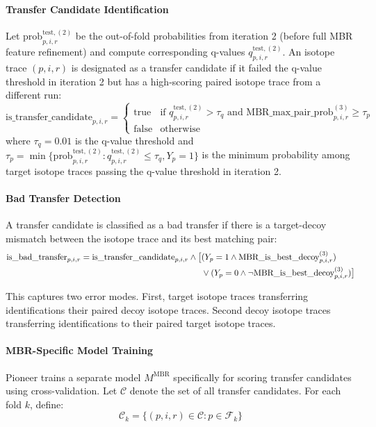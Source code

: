 \documentclass[pdflatex,sn-nature]{sn-jnl}
\begin{document}
\paragraph{Transfer Candidate Identification} Let $\text{prob}_{p,i,r}^{\text{test},(2)}$ be the out-of-fold probabilities from iteration 2 (before full MBR feature refinement) and compute corresponding q-values $q_{p,i,r}^{\text{test},(2)}$. An isotope trace $(p,i,r)$ is designated as a transfer candidate if it failed the q-value threshold in iteration 2 but has a high-scoring paired isotope trace from a different run:
\begin{equation}
  \text{is\_transfer\_candidate}_{p,i,r} = \begin{cases}
      \text{true} & \text{if } q_{p,i,r}^{\text{test},(2)} > \tau_q \text{ and } \text{MBR\_max\_pair\_prob}_{p,i,r}^{(3)} \geq \tau_p \\
      \text{false} & \text{otherwise}
  \end{cases}
\end{equation}
where $\tau_q = 0.01$ is the q-value threshold and $\tau_p = \min\{\text{prob}_{p,i,r}^{\text{test},(2)} : q_{p,i,r}^{\text{test},(2)} \leq \tau_q, Y_p = 1\}$ is the minimum probability among target isotope traces passing the q-value threshold in iteration 2.

\paragraph{Bad Transfer Detection} A transfer candidate is classified as a bad transfer if there is a target-decoy mismatch between the isotope trace and its best matching pair:
\begin{align}
  \text{is\_bad\_transfer}_{p,i,r} = \text{is\_transfer\_candidate}_{p,i,r} \land \big[&(Y_p = 1 \land \text{MBR\_is\_best\_decoy}_{p,i,r}^{(3)}) \notag \\
  &\lor (Y_p = 0 \land \lnot\text{MBR\_is\_best\_decoy}_{p,i,r}^{(3)})\big]
\end{align}

This captures two error modes. First, target isotope traces transferring identifications their paired decoy isotope traces. Second decoy isotope traces transferring identifications to their paired target isotope traces.

\paragraph{MBR-Specific Model Training} Pioneer trains a separate model $M^{\text{MBR}}$ specifically for scoring transfer candidates using cross-validation. Let $\mathcal{C}$ denote the set of all transfer candidates. For each fold $k$, define:
\begin{equation}
  \mathcal{C}_k = \{(p,i,r) \in \mathcal{C} : p \in \mathcal{F}_k\}
\end{equation}
\end{document}
